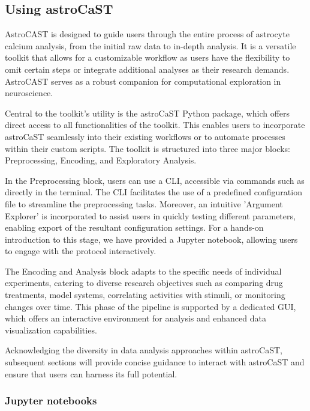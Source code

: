 \subsection{Using astroCaST}

AstroCAST is designed to guide users through the entire process of astrocyte calcium analysis, from the initial raw data to in-depth analysis. It is a versatile toolkit that allows for a customizable workflow as users have the flexibility to omit certain steps or integrate additional analyses as their research demands. AstroCAST serves as a robust companion for computational exploration in neuroscience.

Central to the toolkit's utility is the astroCaST Python package, which offers direct access to all functionalities of the toolkit. This enables users to incorporate astroCaST seamlessly into their existing workflows or to automate processes within their custom scripts. The toolkit is structured into three major blocks: Preprocessing, Encoding, and Exploratory Analysis.

In the Preprocessing block, users can use a \ac{CLI}, accessible via commands such as  directly in the terminal. The \ac{CLI} facilitates the use of a predefined configuration file to streamline the preprocessing tasks. Moreover, an intuitive 'Argument Explorer' is incorporated to assist users in quickly testing different parameters, enabling export of the resultant configuration settings. For a hands-on introduction to this stage, we have provided a Jupyter notebook, allowing users to engage with the protocol interactively.

The Encoding and Analysis block adapts to the specific needs of individual experiments, catering to diverse research objectives such as comparing drug treatments, model systems, correlating activities with stimuli, or monitoring changes over time. This phase of the pipeline is supported by a dedicated \ac{GUI}, which offers an interactive environment for analysis and enhanced data visualization capabilities.

Acknowledging the diversity in data analysis approaches within \ac{astroCaST}, subsequent sections will provide concise guidance to interact with astroCaST and ensure that users can harness its full potential.

\subsubsection{Jupyter notebooks}

